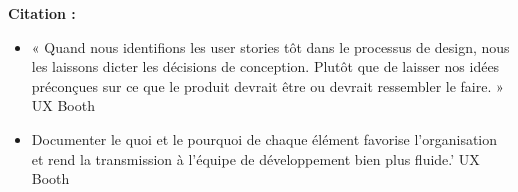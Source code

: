 \textbf{Citation :}

\begin{itemize}
\item « Quand nous identifions les user stories tôt dans le processus de design, nous les laissons dicter les décisions de conception. Plutôt que de laisser nos idées préconçues sur ce que le produit devrait être ou devrait ressembler le faire. » UX Booth
\item Documenter le quoi et le pourquoi de chaque élément favorise l'organisation et rend la transmission à l'équipe de développement bien plus fluide.' UX Booth
\end{itemize}

